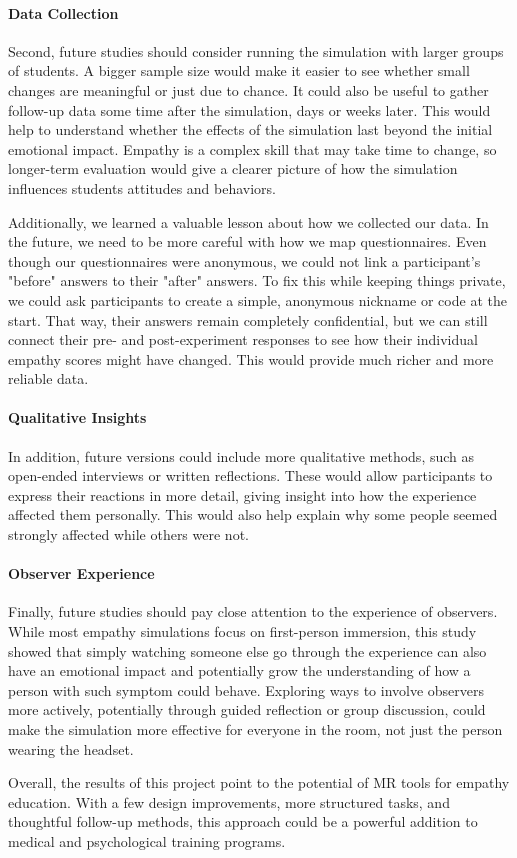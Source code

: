 \paragraph{Data Collection} Second, future studies should consider running the simulation with larger groups of students. A bigger sample size would make it easier to see whether small changes are meaningful or just due to chance. It could also be useful to gather follow-up data some time after the simulation, days or weeks later. This would help to understand whether the effects of the simulation last beyond the initial emotional impact. Empathy is a complex skill that may take time to change, so longer-term evaluation would give a clearer picture of how the simulation influences students attitudes and behaviors.

\vspace{1em}

Additionally, we learned a valuable lesson about how we collected our data. In the future, we need to be more careful with how we map questionnaires. Even though our questionnaires were anonymous, we could not link a participant's "before" answers to their "after" answers. To fix this while keeping things private, we could ask participants to create a simple, anonymous nickname or code at the start. That way, their answers remain completely confidential, but we can still connect their pre- and post-experiment responses to see how their individual empathy scores might have changed. This would provide much richer and more reliable data.

\paragraph{Qualitative Insights} In addition, future versions could include more qualitative methods, such as open-ended interviews or written reflections. These would allow participants to express their reactions in more detail, giving insight into how the experience affected them personally. This would also help explain why some people seemed strongly affected while others were not.

\paragraph{Observer Experience} Finally, future studies should pay close attention to the experience of observers. While most empathy simulations focus on first-person immersion, this study showed that simply watching someone else go through the experience can also have an emotional impact and potentially grow the understanding of how a person with such symptom could behave. Exploring ways to involve observers more actively, potentially through guided reflection or group discussion, could make the simulation more effective for everyone in the room, not just the person wearing the headset.

\vspace{1em}

Overall, the results of this project point to the potential of MR tools for empathy education. With a few design improvements, more structured tasks, and thoughtful follow-up methods, this approach could be a powerful addition to medical and psychological training programs.